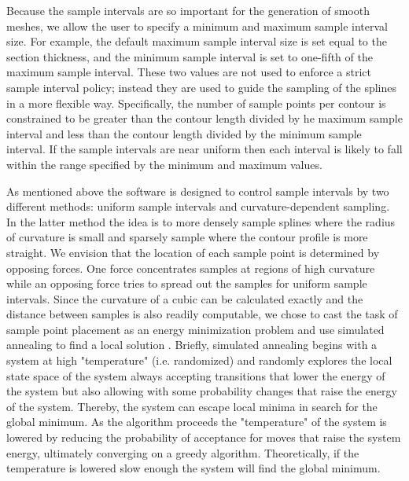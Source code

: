 \documentclass[12pt]{article}
\begin{document}
Because the sample intervals are so important for the generation of
smooth meshes, we allow the user to specify a minimum and maximum sample
interval size. For example, the default maximum sample interval size is
set equal to the section thickness, and the minimum sample interval is
set to one-fifth of the maximum sample interval. These two values are
not used to enforce a strict sample interval policy; instead they are
used to guide the sampling of the splines in a more flexible way.
Specifically, the number of sample points per contour is constrained to be
greater than the contour length divided by he maximum sample interval
and less than the contour length divided by the minimum sample interval.
If the sample intervals are near uniform then each interval is likely
to fall within the range specified by the minimum and maximum values.

As mentioned above the software is designed to control sample intervals
by two different methods: uniform sample intervals and curvature-dependent
sampling. In the latter method the idea is to more densely sample splines
where the radius of curvature is small and sparsely sample where the
contour profile is more straight. We envision that the location of each
sample point is determined by opposing forces. One force concentrates
samples at regions of high curvature while an opposing force tries to
spread out the samples for uniform sample intervals. Since the curvature
of a cubic can be calculated exactly and the distance between samples
is also readily computable, we chose to cast the task of sample point
placement as an energy minimization problem and use simulated annealing
to find a local solution \cite{sim_anneal}. Briefly, simulated annealing
begins with a system at high "temperature" (i.e. randomized) and
randomly explores the local state space of the system always accepting
transitions that lower the energy of the system but also allowing with
some probability changes that raise the energy of the system. Thereby,
the system can escape local minima in search for the global minimum. As
the algorithm proceeds the "temperature" of the system is lowered by
reducing the probability of acceptance for moves that raise the system
energy, ultimately converging on a greedy algorithm. Theoretically, if the
temperature is lowered slow enough the system will find the global minimum.
\end{document}
